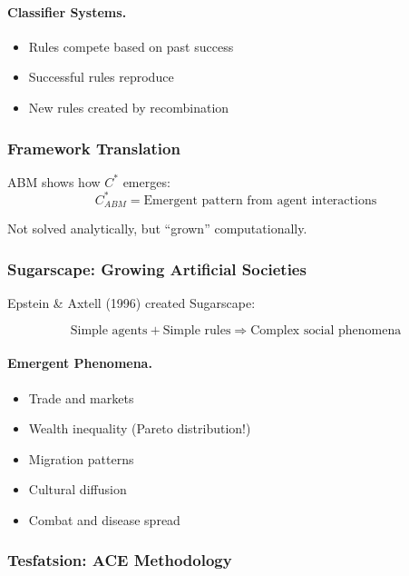 \paragraph{Classifier Systems.}
\begin{itemize}
    \item Rules compete based on past success
    \item Successful rules reproduce
    \item New rules created by recombination
\end{itemize}

\subsubsection{Framework Translation}

ABM shows how $C^*$ emerges:
\begin{equation}
C^*_{ABM} = \text{Emergent pattern from agent interactions}
\end{equation}

Not solved analytically, but ``grown'' computationally.

\subsubsection{Sugarscape: Growing Artificial Societies}

Epstein \& Axtell (1996) created Sugarscape:

\begin{equation}
\text{Simple agents} + \text{Simple rules} \Rightarrow \text{Complex social phenomena}
\end{equation}

\paragraph{Emergent Phenomena.}
\begin{itemize}
    \item Trade and markets
    \item Wealth inequality (Pareto distribution!)
    \item Migration patterns
    \item Cultural diffusion
    \item Combat and disease spread
\end{itemize}

\subsubsection{Tesfatsion: ACE Methodology}

